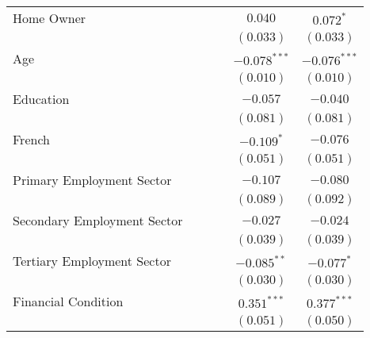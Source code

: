 \begin{center}
\begin{tiny}
\begin{longtable}{l@{} c@{} c@{} c@{} c@{} c@{}}
\quad Home Owner                        &                &                &                & $0.040$          & $0.072^{*}$      \\
                                        &                &                &                & $(0.033)$        & $(0.033)$        \\
\quad Age                               &                &                &                & $-0.078^{***}$   & $-0.076^{***}$   \\
                                        &                &                &                & $(0.010)$        & $(0.010)$        \\
\quad Education                         &                &                &                & $-0.057$         & $-0.040$         \\
                                        &                &                &                & $(0.081)$        & $(0.081)$        \\
\quad French                            &                &                &                & $-0.109^{*}$     & $-0.076$         \\
                                        &                &                &                & $(0.051)$        & $(0.051)$        \\
\quad Primary Employment Sector         &                &                &                & $-0.107$         & $-0.080$         \\
                                        &                &                &                & $(0.089)$        & $(0.092)$        \\
\quad Secondary Employment Sector       &                &                &                & $-0.027$         & $-0.024$         \\
                                        &                &                &                & $(0.039)$        & $(0.039)$        \\
\quad Tertiary Employment Sector        &                &                &                & $-0.085^{**}$    & $-0.077^{*}$     \\
                                        &                &                &                & $(0.030)$        & $(0.030)$        \\
\quad Financial Condition               &                &                &                & $0.351^{***}$    & $0.377^{***}$    \\
                                        &                &                &                & $(0.051)$        & $(0.050)$        \\

\end{longtable}
\end{tiny}
\end{center}
